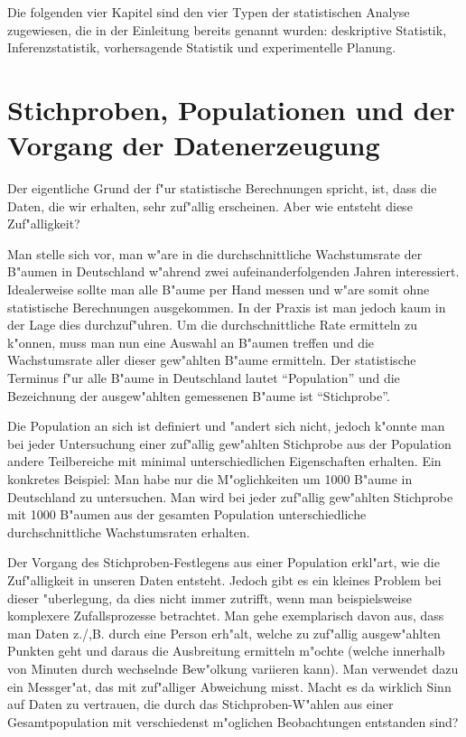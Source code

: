 \documentclass[a4paper,twoside]{tufte-book}\usepackage[]{graphicx}\usepackage[]{color}
\begin{document}
	Die folgenden vier Kapitel sind den vier Typen der statistischen Analyse zugewiesen, die in der Einleitung bereits genannt wurden: deskriptive Statistik, Inferenzstatistik, vorhersagende Statistik und experimentelle Planung. 
	
	\section{Stichproben, Populationen und der Vorgang der Datenerzeugung}
	
	Der eigentliche Grund der f"ur statistische Berechnungen spricht, ist, dass die Daten, die wir erhalten, sehr zuf"allig erscheinen. Aber wie entsteht diese Zuf"alligkeit?
	
	Man stelle sich vor,  man w"are in die durchschnittliche Wachstumsrate der B"aumen in Deutschland w"ahrend zwei aufeinanderfolgenden Jahren interessiert. Idealerweise sollte man alle B"aume per Hand messen und w"are somit ohne statistische Berechnungen ausgekommen. In der Praxis ist man jedoch kaum in der Lage dies durchzuf"uhren. Um die durchschnittliche Rate ermitteln zu k"onnen, muss man nun eine Auswahl an B"aumen treffen und die Wachstumsrate aller dieser gew"ahlten B"aume ermitteln. Der statistische Terminus f"ur alle B"aume in Deutschland lautet "`Population"' und die Bezeichnung der ausgew"ahlten gemessenen B"aume ist "`Stichprobe"'.
	
	Die  Population an sich ist definiert und "andert sich nicht, jedoch k"onnte man bei jeder Untersuchung einer zuf"allig gew"ahlten Stichprobe aus der Population andere Teilbereiche mit minimal unterschiedlichen Eigenschaften erhalten. Ein konkretes Beispiel: Man habe nur die M"oglichkeiten um 1000 B"aume in Deutschland zu untersuchen. Man wird bei jeder zuf"allig gew"ahlten Stichprobe mit 1000 B"aumen aus der gesamten Population unterschiedliche durchschnittliche Wachstumsraten erhalten.
	
	Der Vorgang des Stichproben-Festlegens aus einer Population erkl"art, wie die Zuf"alligkeit in unseren Daten entsteht. Jedoch gibt es ein kleines Problem bei dieser "uberlegung, da dies nicht immer zutrifft, wenn man beispielsweise komplexere Zufallsprozesse betrachtet. Man gehe exemplarisch davon aus, dass man Daten z./,B. durch eine Person erh"alt, welche zu zuf"allig ausgew"ahlten Punkten geht und daraus die Ausbreitung ermitteln m"ochte (welche innerhalb von Minuten durch wechselnde Bew"olkung variieren kann). Man verwendet dazu ein Messger"at, das mit zuf"alliger Abweichung misst. Macht es da wirklich Sinn auf Daten zu vertrauen, die durch das Stichproben-W"ahlen aus einer Gesamtpopulation mit verschiedenst m"oglichen Beobachtungen entstanden sind?
	
\end{document}
